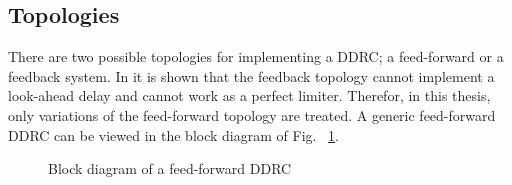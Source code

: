 \documentclass[../main2.tex]{subfiles}
\providecommand{\rootdir}{..}
\begin{document}
\subsection{Topologies}
There are two possible topologies for implementing a DDRC; a feed-forward or a feedback system. In \cite{reiss2012tutorial} it is shown that the feedback topology cannot implement a look-ahead delay and cannot work as a perfect limiter. Therefor, in this thesis, only variations of the feed-forward topology are treated. A generic feed-forward DDRC can be viewed in the block diagram of Fig. ~\ref{fig:block_genericDDRC}. 
\begin{figure}[h]
\centerline{}
\caption{Block diagram of a feed-forward DDRC}
\label{fig:block_genericDDRC}
\end{figure}
\end{document}
